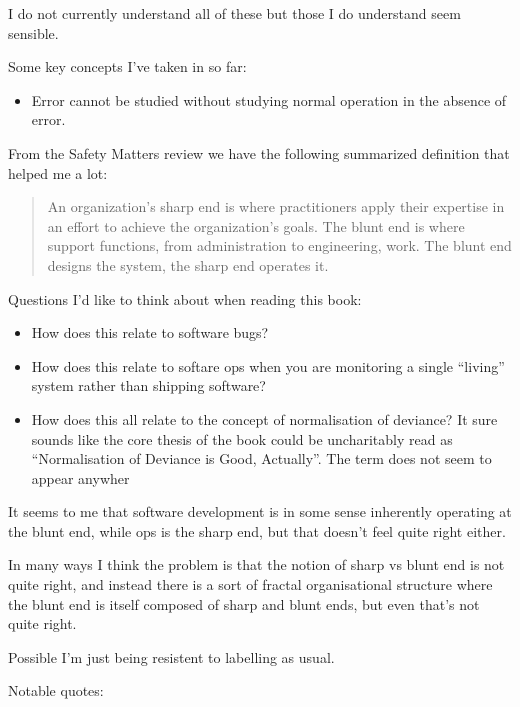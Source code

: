 I do not currently understand all of these but those I do understand seem sensible.

Some key concepts I've taken in so far:

\begin{itemize}
\item Error cannot be studied without studying normal operation in the absence of error.
\end{itemize}

From the Safety Matters review we have the following summarized definition that helped me a lot:

\begin{quotation}
An organization's sharp end is where practitioners apply their expertise in an effort to achieve the organization's goals.  The blunt end is where support functions, from administration to engineering, work.  The blunt end designs the system, the sharp end operates it.
\end{quotation}

Questions I'd like to think about when reading this book:

\begin{itemize}
\item How does this relate to software bugs?
\item How does this relate to softare ops when you are monitoring a single ``living'' system rather than shipping software?
\item How does this all relate to the concept of normalisation of deviance\cite{NormalisationOfDeviance}?
It sure sounds like the core thesis of the book could be uncharitably read as ``Normalisation of Deviance is Good, Actually''.
The term does not seem to appear anywher 
\end{itemize}

It seems to me that software development is in some sense inherently operating at the blunt end,
while ops is the sharp end,
but that doesn't feel quite right either.

In many ways I think the problem is that the notion of sharp vs blunt end is not quite right,
and instead there is a sort of fractal organisational structure where the blunt end is itself composed of sharp and blunt ends,
but even that's not quite right.

Possible I'm just being resistent to labelling as usual.

Notable quotes:

